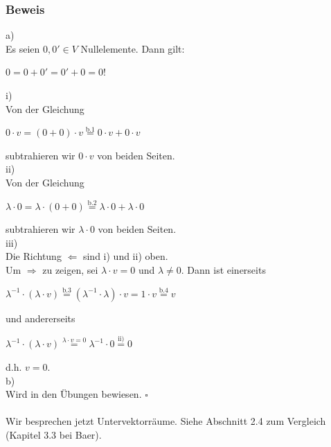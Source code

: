 \documentclass{article}
\begin{document}
\subsubsection*{Beweis}
a) \\
Es seien $0,0' \in V$ Nullelemente. Dann gilt: \\
\begin{center}
    $0 = 0 + 0' = 0' + 0 = 0!$ \\
\end{center}
i) \\
Von der Gleichung \\
\begin{center}
    $0 \cdot v = (0+0) \cdot v \overset{\text{b.1}}{=} 0 \cdot v + 0 \cdot v$ \\
\end{center}
subtrahieren wir $0 \cdot v$ von beiden Seiten. \\
ii) \\
Von der Gleichung \\
\begin{center}
    $\lambda \cdot 0 = \lambda \cdot (0+0) \overset{\text{b.2}}{=} \lambda \cdot 0 + \lambda \cdot 0$ \\
\end{center}
subtrahieren wir $\lambda \cdot 0$ von beiden Seiten. \\
iii) \\
Die Richtung $\Leftarrow$ sind i) und ii) oben. \\
Um $\Rightarrow$ zu zeigen, sei $\lambda \cdot v = 0$ und $\lambda \neq 0$. Dann ist einerseits \\
\begin{center}
    $\lambda^{-1} \cdot (\lambda \cdot v) \overset{\text{b.3}}{=} (\lambda^{-1} \cdot \lambda) \cdot v = 1 \cdot v \overset{\text{b.4}}{=} v$ \\
\end{center}
und andererseits \\
\begin{center}
    $\lambda^{-1} \cdot (\lambda \cdot v) \overset{\lambda \cdot v = 0}{=} \lambda^{-1} \cdot 0 \overset{\text{ii)}}{=} 0$ \\
\end{center}
d.h. $v = 0$. \\
b) \\
Wird in den Übungen bewiesen. $\square$ \\
\\
Wir besprechen jetzt Untervektorräume. Siehe Abschnitt 2.4 zum Vergleich (Kapitel 3.3 bei Baer). \\
\\
\end{document}
